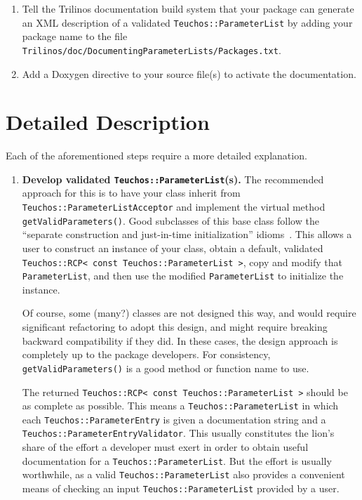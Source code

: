 \documentclass[pdf,ps2pdf,12pt]{smemo}
\begin{document}
\begin{memo}
\begin{enumerate}
\item Tell the Trilinos documentation build system that your package
  can generate an XML description of a validated
  \texttt{Teuchos::ParameterList} by adding your package name to the
  file \texttt{Trilinos/doc/DocumentingParameterLists/Packages.txt}.

\item Add a Doxygen directive to your source file(s) to activate the
  documentation.

\end{enumerate}

\section{Detailed Description}
\label{sec:description}

Each of the aforementioned steps require a more detailed explanation.

\begin{enumerate}

\item \textbf{Develop validated \texttt{Teuchos::ParameterList}(s).}
  The recommended approach for this is to have your class inherit from
  \texttt{Teuchos::ParameterListAcceptor} and implement the virtual
  method \texttt{getValidParameters()}.  Good subclasses of this base
  class follow the ``separate construction and just-in-time
  initialization'' idioms~\cite{TeuchosMemMgt}.  This allows a user to
  construct an instance of your class, obtain a default, validated
  \texttt{Teuchos::RCP< const Teuchos::ParameterList >}, copy and
  modify that \texttt{ParameterList}, and then use the modified
  \texttt{ParameterList} to initialize the instance.

  Of course, some (many?) classes are not designed this way, and would
  require significant refactoring to adopt this design, and might
  require breaking backward compatibility if they did.  In these
  cases, the design approach is completely up to the package
  developers.  For consistency, \texttt{getValidParameters()} is a
  good method or function name to use.

  The returned \texttt{Teuchos::RCP< const Teuchos::ParameterList >}
  should be as complete as possible.  This means a
  \texttt{Teuchos::ParameterList} in which each
  \texttt{Teuchos::Pa\-ra\-met\-er\-En\-try} is given a documentation
  string and a
  \texttt{Teuchos::Pa\-ra\-me\-ter\-En\-try\-Val\-i\-da\-tor}. This
  usually constitutes the lion's share of the effort a developer must
  exert in order to obtain useful documentation for a
  \texttt{Teuchos::ParameterList}.  But the effort is usually
  worthwhile, as a valid \texttt{Teuchos::ParameterList} also provides
  a convenient means of checking an input
  \texttt{Teuchos::ParameterList} provided by a user.


\end{enumerate}
\end{memo}
\end{document}

